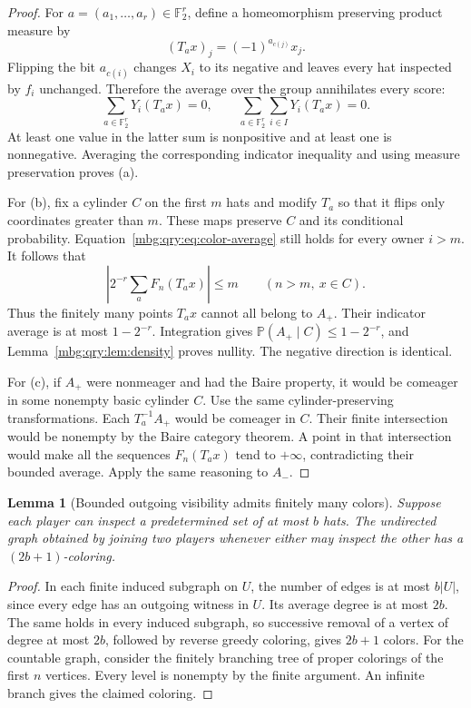 \documentclass[11pt,letterpaper]{article}
\newtheorem{lemma}[theorem]{Lemma}
\theoremstyle{definition}
\newcommand{\Prb}{\mathbb P}
\newcommand{\F}{\mathbb F}
\begin{document}
\begin{proof}
For \(a=(a_1,\ldots,a_r)\in\F_2^r\), define a homeomorphism preserving
product measure by
\[
 (T_ax)_j=(-1)^{a_{c(j)}}x_j.
\]
Flipping the bit \(a_{c(i)}\) changes \(X_i\) to its negative and leaves
every hat inspected by \(f_i\) unchanged. Therefore the average over
the group annihilates every score:
\begin{equation}
 \sum_{a\in\F_2^r}Y_i(T_ax)=0,
 \qquad
 \sum_{a\in\F_2^r}\sum_{i\in I}Y_i(T_ax)=0.
 \label{mbg:qry:eq:color-average}
\end{equation}
At least one value in the latter sum is nonpositive and at least one is
nonnegative. Averaging the corresponding indicator inequality and using
measure preservation proves (a).

For (b), fix a cylinder \(C\) on the first \(m\) hats and modify \(T_a\)
so that it flips only coordinates greater than \(m\). These maps preserve
\(C\) and its conditional probability. Equation~\eqref{mbg:qry:eq:color-average}
still holds for every owner \(i>m\). It follows that
\[
 \left|2^{-r}\sum_aF_n(T_ax)\right|\le m
 \qquad(n>m,\ x\in C).
\]
Thus the finitely many points \(T_ax\) cannot all belong to \(A_+\).
Their indicator average is at most \(1-2^{-r}\). Integration gives
\(\Prb(A_+\mid C)\le1-2^{-r}\), and
Lemma~\ref{mbg:qry:lem:density} proves nullity. The negative direction is identical.

For (c), if \(A_+\) were nonmeager and had the Baire property, it would
be comeager in some nonempty basic cylinder \(C\). Use the same
cylinder-preserving transformations. Each \(T_a^{-1}A_+\) would be
comeager in \(C\). Their finite intersection would be nonempty by the
Baire category theorem. A point in that intersection would make all
the sequences \(F_n(T_ax)\) tend to \(+\infty\), contradicting their
bounded average. Apply the same reasoning to \(A_-\).
\end{proof}

\begin{lemma}[Bounded outgoing visibility admits finitely many colors]
\label{mbg:qry:lem:coloring}
Suppose each player can inspect a predetermined set of at most \(b\)
hats. The undirected graph obtained by joining two players whenever
either may inspect the other has a \((2b+1)\)-coloring.
\end{lemma}

\begin{proof}
In each finite induced subgraph on \(U\), the number of edges is at most
\(b|U|\), since every edge has an outgoing witness in \(U\).
Its average degree is at most \(2b\). The same holds in every induced
subgraph, so successive removal of a vertex of degree at most \(2b\),
followed by reverse greedy coloring, gives \(2b+1\) colors.
For the countable graph, consider the finitely branching tree of proper
colorings of the first \(n\) vertices. Every level is nonempty by the
finite argument. An infinite branch gives the claimed coloring.
\end{proof}
\end{document}
